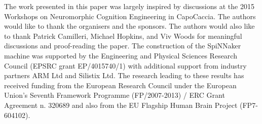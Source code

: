\documentclass{frontiersENG} %
\begin{document}
The work presented in this paper was largely inspired by discussions at the 2015 Workshops on Neuromorphic Cognition Engineering in CapoCaccia.
The authors would like to thank the organisers and the sponsors.
The authors would also like to thank Patrick Camilleri, Michael Hopkins, and Viv Woods for meaningful discussions and proof-reading the paper.
The construction of the SpiNNaker machine was supported by the Engineering and Physical Sciences Research Council (EPSRC grant EP/4015740/1) with additional support from industry partners ARM Ltd and Silistix Ltd.
The research leading to these results has received funding from the European Research Council under the European Union's Seventh Framework Programme (FP/2007-2013) / ERC Grant Agreement n. 320689 and also from the EU Flagship Human Brain Project (FP7-604102). 



%
\end{document}

